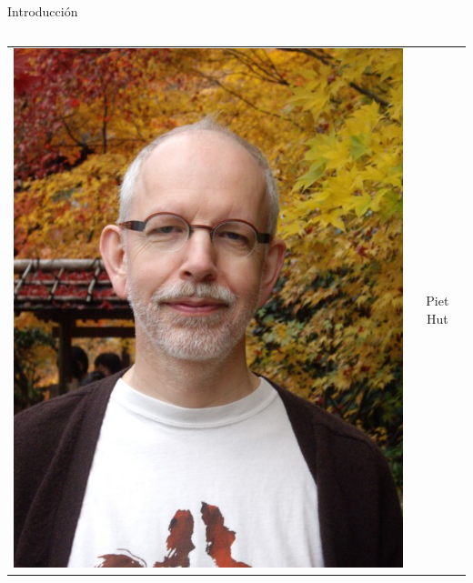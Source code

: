 \documentclass[handout]{beamer}
\begin{document}
\begin{frame}{Introducci\'on}
\begin{columns}
\begin{column}{.5\textwidth}
\begin{tabular}{cc}
				\includegraphics[height=0.3\textheight]{sources/images/hut.jpg}
				& Piet Hut \\
			\end{tabular}
		\end{column}
	\end{columns}
	
\end{frame}
\end{document}
